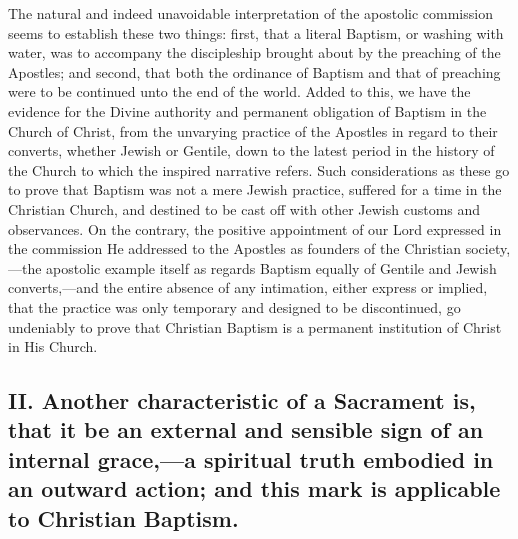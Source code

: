 \documentclass[]{book}
\begin{document}
The natural and indeed unavoidable interpretation of the apostolic commission seems to establish these two things: first, that a literal Baptism, or washing with water, was to accompany the discipleship brought about by the preaching of the Apostles; and second, that both the ordinance of Baptism and that of preaching were to be continued unto the end of the world. Added to this, we have the evidence for the Divine authority and permanent obligation of Baptism in the Church of Christ, from the unvarying practice of the Apostles in regard to their converts, whether Jewish or Gentile, down to the latest period in the history of the Church to which the inspired narrative refers. Such considerations as these go to prove that Baptism was not a mere Jewish practice, suffered for a time in the Christian Church, and destined to be cast off with other Jewish customs and observances. On the contrary, the positive appointment of our Lord expressed in the commission He addressed to the Apostles as founders of the Christian society,---the apostolic example itself as regards Baptism equally of Gentile and Jewish converts,---and the entire absence of any intimation, either express or implied, that the practice was only temporary and designed to be discontinued, go undeniably to prove that Christian Baptism is a permanent institution of Christ in His Church.

\hypertarget{ii.-another-characteristic-of-a-sacrament-is-that-it-be-an-external-and-sensible-sign-of-an-internal-gracea-spiritual-truth-embodied-in-an-outward-action-and-this-mark-is-applicable-to-christian-baptism.}{%
\subsection{II. Another characteristic of a Sacrament is, that it be an external and sensible sign of an internal grace,---a spiritual truth embodied in an outward action; and this mark is applicable to Christian Baptism.}\label{ii.-another-characteristic-of-a-sacrament-is-that-it-be-an-external-and-sensible-sign-of-an-internal-gracea-spiritual-truth-embodied-in-an-outward-action-and-this-mark-is-applicable-to-christian-baptism.}}
\end{document}
